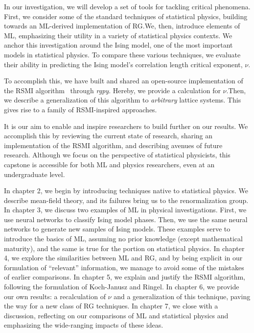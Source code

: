 In our investigation, we will develop a set of tools for tackling
critical phenomena. First, we consider some of the standard techniques
of statistical physics, building towards an ML-derived
implementation of RG.\@ We, then, introduce elements
of ML, emphasizing their utility in a variety of statistical physics
contexts. We anchor this investigation around the Ising
model, one of the most important models in statistical physics. To
compare these various techniques, we evaluate their ability in
predicting the Ising model's correlation length critical exponent,
$\nu$.

To accomplish this, we have built and shared an open-source
implementation of the RSMI algorithm~\cite{rgpy} through
\textit{rgpy}. Hereby, we provide a calculation
for $\nu$.Then, we describe a generalization of
this algorithm to \textit{arbitrary} lattice systems. This gives rise
to a family of RSMI-inspired approaches.

It is our aim to enable and inspire researchers to build further on
our results. We accomplish this by reviewing the current state of
research, sharing an implementation of the RSMI algorithm, and
describing avenues of future research. Although we focus on the
perspective of statistical physicists, this capstone is accessible for
both ML and physics researchers, even at an undergraduate level.

In chapter 2, we begin by introducing techniques native to
statistical physics. We describe mean-field theory, and its failures
bring us to the renormalization group. In chapter 3, we discuss
two examples of ML in physical investigations.  First, we use neural
networks to classify Ising model phases. Then, we use the same neural
networks to generate new samples of Ising models. These examples serve
to introduce the basics of ML, assuming no prior knowledge (except
mathematical maturity), and the same is true for the portion on
statistical physics. In chapter 4, we explore the
similarities between ML and RG, and by being explicit in our
formulation of ``relevant'' information, we manage to avoid some of
the mistakes of earlier comparisons. In chapter 5, we explain
and justify the RSMI algorithm, following the formulation of
Koch-Janusz and Ringel. In chapter 6, we provide our own
results: a recalculation of $\nu$ and a generalization of this
technique, paving the way for a new class of RG techniques. In
chapter 7, we close with a discussion, reflecting on our
comparisons of ML and statistical physics and emphasizing the
wide-ranging impacts of these ideas.
